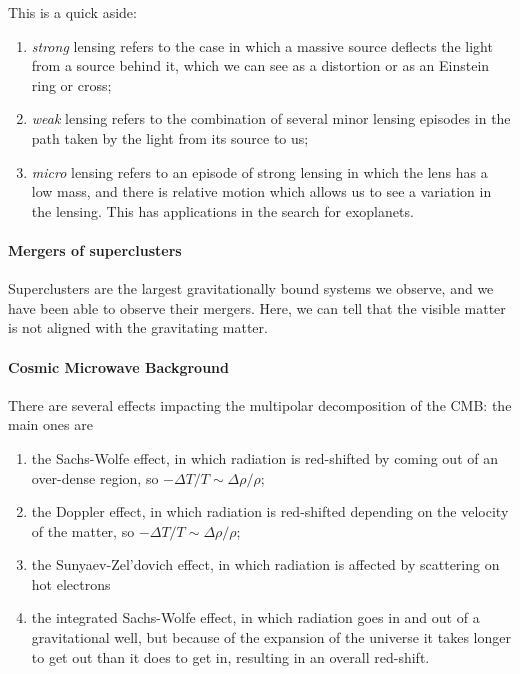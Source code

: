 \documentclass[main.tex]{subfiles}
\begin{document}
This is a quick aside: 
\begin{enumerate}
    \item \emph{strong} lensing refers to the case in which a massive source 
    deflects the light from a source behind it, which we can see as a distortion or as an 
    Einstein ring or cross;
    \item \emph{weak} lensing refers to the combination of several minor lensing episodes
    in the path taken by the light from its source to us;
    \item \emph{micro} lensing refers to an episode of strong lensing in which the lens
    has a low mass, and there is relative motion which allows us to see a variation
    in the lensing. 
    This has applications in the search for exoplanets. 
\end{enumerate}

\paragraph{Mergers of superclusters}

Superclusters are the largest gravitationally bound systems we observe, and 
we have been able to observe their mergers. 
Here, we can tell that the visible matter is not aligned with the gravitating matter. 

\paragraph{Cosmic Microwave Background}

There are several effects impacting the multipolar decomposition of the CMB: 
the main ones are 
\begin{enumerate}
    \item the Sachs-Wolfe effect, in which radiation is red-shifted 
    by coming out of an over-dense region, so \(-\Delta T / T \sim \Delta \rho / \rho \);
    \item the Doppler effect, in which radiation is red-shifted depending on
    the velocity of the matter, so \(- \Delta T / T \sim \Delta \rho / \rho \);
    \item the Sunyaev-Zel'dovich effect, in which radiation is affected by 
    scattering on hot electrons
    \item the integrated Sachs-Wolfe effect, in which radiation goes in and out
    of a gravitational well, but because of the expansion of the universe it takes 
    longer to get out than it does to get in, resulting in an overall red-shift. 
\end{enumerate}
\end{document}
